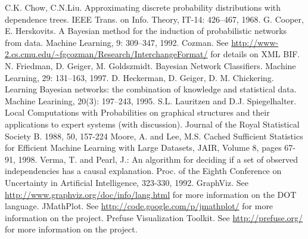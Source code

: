 \begin{thebibliography}{999}
		C.K. Chow, C.N.Liu.
		Approximating discrete probability distributions with dependence trees.
		IEEE Trans. on Info. Theory, IT-14: 426--467, 1968.
		G. Cooper, E. Herskovits. 
		A Bayesian method for the induction of probabilistic networks from data. 
		Machine Learning, 9: 309--347, 1992.
		Cozman.
		See {\sf \url{http://www-2.cs.cmu.edu/\~fgcozman/Research/InterchangeFormat/}{}}
		for details on XML BIF.
		N. Friedman, D. Geiger, M. Goldszmidt. 
		Bayesian Network Classifiers. 
		Machine Learning, 29: 131--163, 1997.
		D. Heckerman, D. Geiger, D. M. Chickering. 
		Learning Bayesian networks: the combination of knowledge and statistical data. 
		Machine Learining, 20(3): 197--243, 1995.
		S.L. Lauritzen and D.J. Spiegelhalter.
		Local Computations with Probabilities on graphical structures and their applications to expert systems (with discussion).
		Journal of the Royal Statistical Society B.
		1988, 50, 157-224
		Moore, A. and Lee, M.S. Cached Sufficient Statistics for Efficient Machine Learning with Large Datasets,
		JAIR, Volume 8, pages 67-91, 1998.
		Verma, T. and Pearl, J.:
		An algorithm for deciding if a set of observed independencies has a causal explanation.
		Proc. of the Eighth Conference on Uncertainty in Artificial Intelligence,
		323-330, 1992.
		GraphViz. See \url{http://www.graphviz.org/doc/info/lang.html}{} for
		more information on the DOT language.
		JMathPlot. See \url{http://code.google.com/p/jmathplot/}{} for
		more information on the project.
        Prefuse Visualization Toolkit. See \url{http://prefuse.org/}{} for
        more information on the project.

\end{thebibliography}
